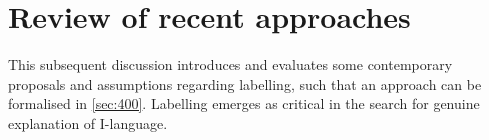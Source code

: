 \section{Review of recent approaches}\label{sec:300}

This subsequent discussion introduces and evaluates some contemporary proposals and assumptions regarding labelling, such that an approach can be formalised in \autoref{sec:400}. Labelling emerges as critical in the search for genuine explanation of I-language.












